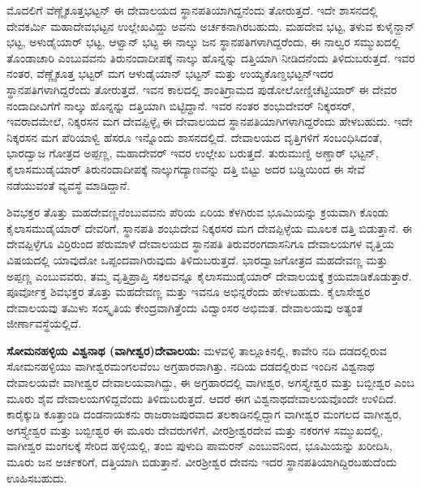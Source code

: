 ಮೊದಲಿಗೆ ವೆಣ್ಣೈಕೂತ್ತಭಟ್ಟನ್​ ಈ ದೇವಾಲಯದ ಸ್ಥಾನಪತಿಯಾಗಿದ್ದನೆಂದು ತೋರುತ್ತದೆ. ಇದೇ ಶಾಸನದಲ್ಲಿ ದೇವಕರ್ಮಿ ಮಹಾದೇವಭಟ್ಟನ ಉಲ್ಲೇಖವಿದ್ದು ಅವನು ಅರ್ಚಕನಾಗಿರಬಹುದು. ಮಹದೇವ ಭಟ್ಟ, ತಳುವ ಕುಳೈನ್ದಾನ್​ ಭಟ್ಟ, ಅಳುಡೈಯಾರ್​ ಭಟ್ಟ, ಆಳ್ವಾನ್​ ಭಟ್ಟ ಈ ನಾಲ್ಕು ಜನ ಸ್ಥಾನಪತಿಗಳಾಗಿದ್ದರೆಂದು, ಈ ನಾಲ್ವರ ಸಮ್ಮುಖದಲ್ಲಿ ತೊಂಡಾಚಾರಿ ಎಂಬುವವನು ತಿರುನಂದಾದೀಪಕ್ಕೆ ನಾಲ್ಕು ಹೊನ್ನನ್ನು ದತ್ತಿಯಾಗಿ ನೀಡಿದನೆಂದು ತಿಳಿದುಬರುತ್ತದೆ. ಇವರ ನಂತರ, ವೆಣ್ಣೈಕೂತ್ತ ಭಟ್ಟರ್​ ಮಗ ಆಳುಡೈಯಾನ್​ ಭಟ್ಟನ್​ ಮತ್ತು ಉಯ್ಯಕೊಣ್ಡಭಟ್ಟನ್​ ಇದರ ಸ್ಥಾನಪತಿಗಳಾಗಿದ್ದರೆಂದು ತೋರುತ್ತದೆ. ಇವನ ಕಾಲದಲ್ಲಿ ಶಾಂತಿಗ್ರಾಮದ ಪುಡೋಲೋಣ್ಡಿಚೆಟ್ಟಿಯಾರ್​ ಈ ದೇವರ ನಂದಾದೀವಿಗೆಗೆ ನಾಲ್ಕು ಹೊನ್ನನ್ನು ದತ್ತಿಯಾಗಿ ಬಿಟ್ಟಿದ್ದಾನೆ. ಇವರ ನಂತರ ಶಂಭುದೇವರ್​ ನಿಕ್ಕರಸರ್​, ಇವರಾದಮೇಲೆ, ನಿಕ್ಕರಸನ ಮಗ ದೇವಪ್ಪಿಳ್ಳೈ ಈ ದೇವಾಲಯದ ಸ್ಥಾನಪತಿಯಾಗಿಗಳಾಗಿದ್ದರೆಂದು ಹೇಳಬಹುದು. ಇದೇ ನಿಕ್ಕರಸನ ಮಗ ಪೆರಿಯಾಳ್ವಿ ಹೆಸರೂ ಇನ್ನೊಂದು ಶಾಸನದಲ್ಲಿದೆ. ದೇವಾಲಯದ ವೃತ್ತಿಗಳಿಗೆ ಸಂಬಂಧಿಸಿದಂತೆ, ಭಾರದ್ವಾಜ ಗೋತ್ರದ ಅಪ್ಪಣ್ಣ, ಮಹಾದೇವರ್​ ಇವರ ಉಲ್ಲೇಖ ಬರುತ್ತದೆ. ತುರುಮುಣ್ಡಿ ಅಣ್ಡಾರ್​ ಭಟ್ಟನ್​, ಕೈಲಾಸಮುಡೈಯಾರ್​ ತಿರುನಂದಾದೀಪಕ್ಕೆ ನಾಲ್ಕುಗದ್ಯಾಣವನ್ನು ದತ್ತಿ ಬಿಟ್ಟು ಅದರ ಬಡ್ಡಿಯಿಂದ ಈ ಸೇವೆ ನಡೆಯುವಂತೆ ವ್ಯವಸ್ಥೆ ಮಾಡಿದ್ದಾನೆ.

ಶಿವಭಕ್ತರ ತೊತ್ತು ಮಹದೇವಣ್ಣನೆಂಬುವವನು ಪೆರಿಯ ಏರಿಯ ಕೆಳಗಿರುವ ಭೂಮಿಯನ್ನು ಕ್ರಯವಾಗಿ ಕೊಂಡು ಕೈಲಾಸಮುಡೈಯಾರ್​ ದೇವರಿಗೆ, ಸ್ಥಾನಪತಿ ಶಂಭುದೇವ ನಿಕ್ಕರಸರ ಮಗ ದೇವಪ್ಪಿಳ್ಳೆಯ ಮೂಲಕ ದತ್ತಿ ಬಿಡುತ್ತಾನೆ. ಈ ದೇವಪ್ಪಿಳ್ಳೆಗೂ ವಿರ್ರಿರುಂದ ಪೆರುಮಾಳೆ ದೇವಾಲಯದ ಸ್ಥಾನಪತಿ ತಿರುವರಂಗದಾಸನಿಗೂ ದೇವಾಲಯಗಳ ವೃತ್ತಿಯ ವಿಷಯದಲ್ಲಿ ಯಾವುದೋ ಒಪ್ಪಂದವಾಗಿರುವುದು ತಿಳಿದುಬರುತ್ತದೆ. ಭಾರದ್ವಾಜಗೋತ್ರದ ಮಹದೇವಣ್ಣ ಮತ್ತು ಅಪ್ಪಣ್ಣ ಎಂಬುವವರು, ತಮ್ಮ ವೃತ್ತಿಪ್ರಾಪ್ತಿ ಸಕಲವನ್ನೂ ಕೈಲಾಸಮುಡೈಯಾರ್​ ದೇವಾಲಯಕ್ಕೆ ಕ್ರಯಮಾಡಿಕೊಡುತ್ತಾರೆ. ಪೂರ್ವೋಕ್ತ ಶಿವಭಕ್ತರ ತೊತ್ತು ಮಹದೇವಣ್ಣ ಮತ್ತು ಇವನೂ ಅಭಿನ್ನರೆಂದು ಹೇಳಬಹುದು. ಕೈಲಾಸೇಶ್ವರ ದೇವಾಲಯವು ತಮಿಳು ಸಂಸ್ಕೃತಿಯ ಕೇಂದ್ರವಾಗಿತ್ತೆಂದು ವಿದ್ವಾಂಸರ ಅಭಿಮತ. ದೇವಾಲಯವು ಅತ್ಯಂತ ಜೀರ್ಣಾವಸ್ಥೆಯಲ್ಲಿದೆ.

\textbf{ಸೋಮನಹಳ್ಳಿಯ ವಿಶ್ವನಾಥ (ವಾಗೀಶ್ವರ)ದೇವಾಲಯ:} ಮಳವಳ್ಳಿ ತಾಲ್ಲೂಕಿನಲ್ಲಿ, ಕಾವೇರಿ ನದಿ ದಡದಲ್ಲಿರುವ ಸೋಮನಹಳ್ಳಿಯು ವಾಗೀಶ್ವರಮಂಗಲವೆಂಬ ಅಗ್ರಹಾರವಾಗಿತ್ತು. ನದಿಯ ದಡದಲ್ಲಿರುವ ಇಂದಿನ ವಿಶ್ವನಾಥ ದೇವಾಲಯವೇ ವಾಗೀಶ್ವರ ದೇವಾಲಯವಾಗಿದ್ದು, ಈ ಅಗ್ರಹಾರದಲ್ಲಿ ವಾಗೀಶ್ವರ, ಅಗಸ್ತ್ಯೇಶ್ವರ ಮತ್ತು ಬಬ್ಬೀಶ್ವರ ಎಂಬ ಮೂರು ಶೈವ ದೇವಾಲಯಗಳಿದ್ದವೆಂದು ತಿಳಿದುಬರುತ್ತದೆ. ಆದರೆ ಈಗ ವಿಶ್ವನಾಥದೇವಾಲಯವೊಂದೇ ಉಳಿದಿದೆ. ಕಾರೈಕ್ಕುಡಿ ಕೂತ್ತಾಂಡಿ ದಂಡನಾಯಕನು ರಾಜರಾಜಪುರವಾದ ತಲಕಾಡಿನಲ್ಲಿದ್ದಾಗ ವಾಗೀಶ್ವರ ಮಂಗಲದ ವಾಗೀಶ್ವರ, ಅಗಸ್ತ್ಯೇಶ್ವರ ಮತ್ತು ಬಬ್ಬೀಶ್ವರ ಈ ಮೂರು ದೇವರುಗಳಿಗೆ, ವೀರಶ‍್ರೀಶ್ವರದೇವ ಮತ್ತು ನಕರಗಳ ಸಮ್ಮುಖದಲ್ಲಿ, ವಾಗೀಶ್ವರ ಮಂಗಲಕ್ಕೆ ಸೇರಿದ ಹಳ್ಳಿಯಲ್ಲಿ, ತಂಬಿ ಪುಳುದಿ ಪಾಮರನ್​ ಎಂಬುವನಿಂದ, ಭೂಮಿಯನ್ನು ಖರೀದಿಸಿ, ಮೂರು ಜನ ಅರ್ಚಕರಿಗೆ, ದತ್ತಿಯಾಗಿ ಬಿಡುತ್ತಾನೆ. ವೀರಶ‍್ರೀಶ್ವರ ದೇವನು ಇದರ ಸ್ಥಾನಪತಿಯಾಗಿದ್ದಿರಬಹುದೆಂದು ಊಹಿಸಬಹುದು.

